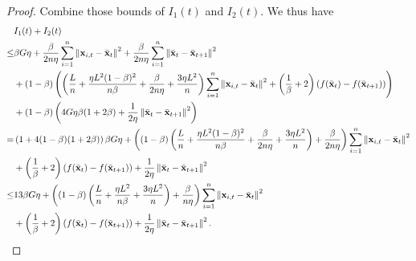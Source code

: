 \documentclass{article}
\begin{document}
\begin{proof}
Combine those bounds of $I_1(t)$ and $I_2(t)$. We thus have
\begin{align}
\nonumber
& I_1(t) + I_2(t) \\ \nonumber 
\le & \beta G \eta + \frac{\beta}{2n\eta }\sum_{i=1}^n \left\lVert{\bf x}_{i,t} - \bar{{\bf x}}_t\right\rVert^2 + \frac{\beta }{2n\eta }\sum_{i=1}^n \left\lVert\bar{{\bf x}}_t - \bar{{\bf x}}_{t+1}\right\rVert^2 \\ \nonumber
& + (1-\beta) \left(  \left(  \frac{L}{n} + \frac{\eta L^2(1-\beta)^2}{n\beta} + \frac{\beta}{2n\eta} + \frac{3\eta L^2}{n}  \right)\sum_{i=1}^n\left\lVert{\bf x}_{i,t} - \bar{{\bf x}}_t \right\rVert^2 + \left( \frac{1}{\beta} + 2 \right)\left( f(\bar{{\bf x}}_t) - f(\bar{{\bf x}}_{t+1}) \right)  \right)\\ \nonumber 
&+ (1-\beta) \left(  4G\eta\beta(1 + 2\beta) +  \frac{1}{2\eta} \left\lVert \bar{{\bf x}}_t - \bar{{\bf x}}_{t+1}\right\rVert^2  \right) \\ \nonumber
= & \left( 1 + 4(1-\beta)(1+2\beta) \right)\beta G \eta + \left(  (1-\beta)  \left(  \frac{L}{n} + \frac{\eta L^2(1-\beta)^2}{n\beta} + \frac{\beta}{2n\eta} + \frac{3\eta L^2}{n}  \right) + \frac{\beta}{2n\eta}  \right)\sum_{i=1}^n\left\lVert{\bf x}_{i,t} - \bar{{\bf x}}_t \right\rVert^2 \\ \nonumber 
&+ \left( \frac{1}{\beta} + 2 \right)\left( f(\bar{{\bf x}}_t) - f(\bar{{\bf x}}_{t+1}) \right) + \frac{1}{2\eta}\left\lVert \bar{{\bf x}}_t - \bar{{\bf x}}_{t+1}\right\rVert^2 \\ \nonumber
\le & 13\beta G \eta + \left(  (1-\beta)  \left(  \frac{L}{n} + \frac{\eta L^2}{n\beta} + \frac{3\eta L^2}{n}  \right) + \frac{\beta}{n\eta}  \right)\sum_{i=1}^n\left\lVert{\bf x}_{i,t} - \bar{{\bf x}}_t \right\rVert^2 \\ \nonumber 
&+ \left( \frac{1}{\beta} + 2 \right)\left( f(\bar{{\bf x}}_t) - f(\bar{{\bf x}}_{t+1}) \right) + \frac{1}{2\eta}\left\lVert \bar{{\bf x}}_t - \bar{{\bf x}}_{t+1}\right\rVert^2.
\end{align}







\end{proof}
\end{document}

